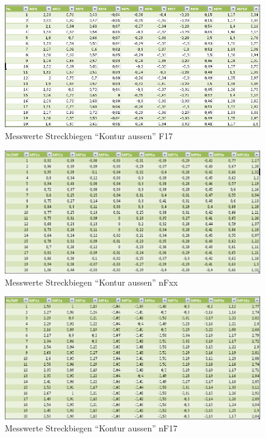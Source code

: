 \documentclass[12pt,a4paper,parskip]{scrartcl}
\begin{document}
\begin{figure}[hbtp]
\centering
\includegraphics[width=1\textwidth]{F17Bieg.jpg}
\caption{Messwerte Streckbiegen "`Kontur aussen"' F17}
\end{figure}
\begin{figure}[hbtp]
\centering
\includegraphics[width=1\textwidth]{nFxxBieg.jpg}
\caption{Messwerte Streckbiegen "`Kontur aussen"' nFxx}
\end{figure}
\begin{figure}[hbtp]
\centering
\includegraphics[width=1\textwidth]{nF17Bieg.jpg}
\caption{Messwerte Streckbiegen "`Kontur aussen"' nF17}
\end{figure}
\end{document}
